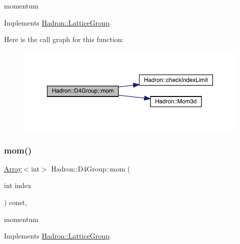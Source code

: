 momentum 

Implements \mbox{\hyperlink{structHadron_1_1LatticeGroup_ad577b65041dd9a6e84b1f3bd49cb8fce}{Hadron\+::\+Lattice\+Group}}.

Here is the call graph for this function\+:
\nopagebreak
\begin{figure}[H]
\begin{center}
\leavevmode
\includegraphics[width=350pt]{de/d5e/structHadron_1_1D4Group_aeb999dc93b1a1a99ed4ffd53977a163b_cgraph}
\end{center}
\end{figure}
\mbox{\label{structHadron_1_1D4Group_aeb999dc93b1a1a99ed4ffd53977a163b}} 
\subsubsection{\texorpdfstring{mom()}{mom()}\hspace{0.1cm}{\footnotesize\ttfamily [3/3]}}
{\footnotesize\ttfamily \mbox{\hyperlink{classXMLArray_1_1Array}{Array}}$<$int$>$ Hadron\+::\+D4\+Group\+::mom (\begin{DoxyParamCaption}\item[{int}]{index }\end{DoxyParamCaption}) const\hspace{0.3cm}{\ttfamily [inline]}, {\ttfamily [virtual]}}

momentum 

Implements \mbox{\hyperlink{structHadron_1_1LatticeGroup_ad577b65041dd9a6e84b1f3bd49cb8fce}{Hadron\+::\+Lattice\+Group}}.


